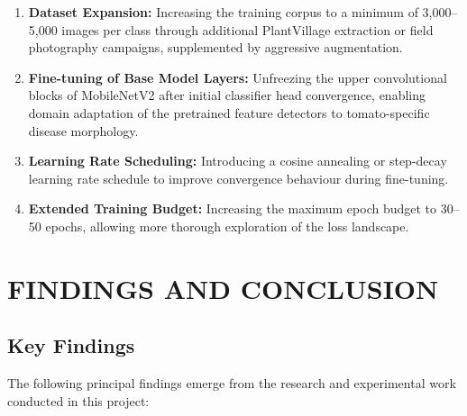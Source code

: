 \documentclass[12pt,a4paper]{report}
\begin{document}
\begin{enumerate}[label=\arabic*., itemsep=4pt]
    \item \textbf{Dataset Expansion:} Increasing the training corpus to a minimum of 3,000--5,000 images per class through additional PlantVillage extraction or field photography campaigns, supplemented by aggressive augmentation.
    \item \textbf{Fine-tuning of Base Model Layers:} Unfreezing the upper convolutional blocks of MobileNetV2 after initial classifier head convergence, enabling domain adaptation of the pretrained feature detectors to tomato-specific disease morphology.
    \item \textbf{Learning Rate Scheduling:} Introducing a cosine annealing or step-decay learning rate schedule to improve convergence behaviour during fine-tuning.
    \item \textbf{Extended Training Budget:} Increasing the maximum epoch budget to 30--50 epochs, allowing more thorough exploration of the loss landscape.
\end{enumerate}

\chapter{FINDINGS AND CONCLUSION}

\section{Key Findings}

The following principal findings emerge from the research and experimental work conducted in this project:
\end{document}
